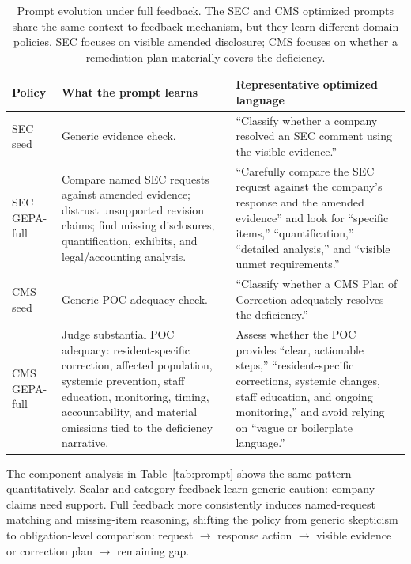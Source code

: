 \documentclass[11pt]{article}
\begin{document}
\begin{table}[t]
\centering
\small
\setlength{\tabcolsep}{4pt}
\begin{tabular}{p{}p{}p{}}
\toprule
\textbf{Policy} & \textbf{What the prompt learns} & \textbf{Representative optimized language} \\
\midrule
SEC seed & Generic evidence check. & ``Classify whether a company resolved an SEC comment using the visible evidence.'' \\
\midrule
SEC GEPA-full & Compare named SEC requests against amended evidence; distrust unsupported revision claims; find missing disclosures, quantification, exhibits, and legal/accounting analysis. & ``Carefully compare the SEC request against the company's response and the amended evidence'' and look for ``specific items,'' ``quantification,'' ``detailed analysis,'' and ``visible unmet requirements.'' \\
\midrule
CMS seed & Generic POC adequacy check. & ``Classify whether a CMS Plan of Correction adequately resolves the deficiency.'' \\
\midrule
CMS GEPA-full & Judge substantial POC adequacy: resident-specific correction, affected population, systemic prevention, staff education, monitoring, timing, accountability, and material omissions tied to the deficiency narrative. & Assess whether the POC provides ``clear, actionable steps,'' ``resident-specific corrections, systemic changes, staff education, and ongoing monitoring,'' and avoid relying on ``vague or boilerplate language.'' \\
\bottomrule
\end{tabular}
\caption{Prompt evolution under full feedback. The SEC and CMS optimized prompts share the same context-to-feedback mechanism, but they learn different domain policies. SEC focuses on visible amended disclosure; CMS focuses on whether a remediation plan materially covers the deficiency.}
\label{tab:prompt_compare}
\end{table}

The component analysis in Table~\ref{tab:prompt} shows the same pattern quantitatively. Scalar and category feedback learn generic caution: company claims need support. Full feedback more consistently induces named-request matching and missing-item reasoning, shifting the policy from generic skepticism to obligation-level comparison: request $\rightarrow$ response action $\rightarrow$ visible evidence or correction plan $\rightarrow$ remaining gap.
\end{document}
